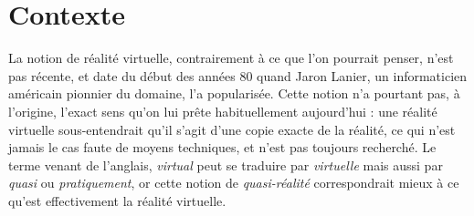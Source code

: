 \section{Contexte}


	La notion de réalité virtuelle, contrairement à ce que l'on pourrait penser, n'est pas récente, et date du début des années 80 quand Jaron Lanier, un informaticien américain pionnier du domaine, l'a popularisée. Cette notion n'a pourtant pas, à l'origine, l'exact sens qu'on lui prête habituellement aujourd'hui : une réalité virtuelle sous-entendrait qu'il s'agit d'une copie exacte de la réalité, ce qui n'est jamais le cas faute de moyens techniques, et n'est pas toujours recherché. Le terme venant  de l'anglais, \emph{virtual} peut se traduire par \emph{virtuelle} mais aussi par \emph{quasi} ou \emph{pratiquement}, or cette notion de \emph{quasi-réalité} correspondrait mieux à ce qu'est effectivement la réalité virtuelle. 
\\

